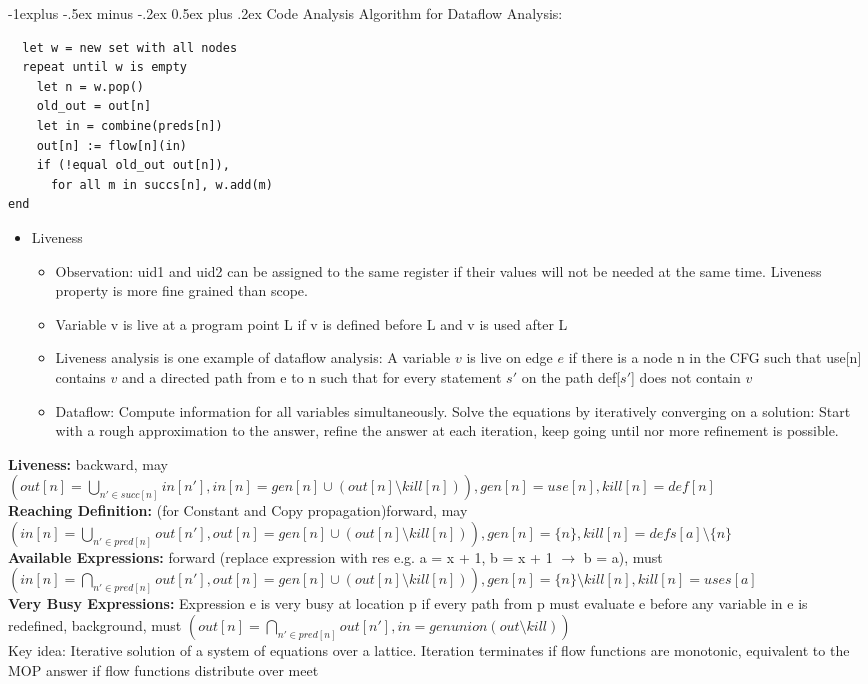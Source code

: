\documentclass[10pt,landscape]{article}
\makeatletter
\renewcommand{\subsection}{\@startsection{subsection}{2}{0mm}%
                                {-1explus -.5ex minus -.2ex}%
                                {0.5ex plus .2ex}%
                                {\normalfont\normalsize\bfseries}}
\makeatother
\begin{document}
\begin{multicols}{3}
\subsection{Code Analysis}
Algorithm for Dataflow Analysis:
\begin{verbatim}
  let w = new set with all nodes
  repeat until w is empty
    let n = w.pop()
    old_out = out[n]
    let in = combine(preds[n])
    out[n] := flow[n](in)
    if (!equal old_out out[n]),
      for all m in succs[n], w.add(m)
end
\end{verbatim}
\begin{itemize}
	\item Liveness
	\begin{itemize}
		\item Observation: uid1 and uid2 can be assigned to the same register if their values will not be needed at the same time. Liveness property is more fine grained than scope.
		\item Variable v is live at a program point L if v is defined before L and v is used after L
		\item Liveness analysis is one example of dataflow analysis: A variable $v$ is live on edge $e$ if there is a node n in the CFG such that use[n] contains $v$ and a directed path from e to n such that for every statement $s'$ on the path def[$s'$] does not contain $v$
		\item Dataflow: Compute information for all variables simultaneously. Solve the equations by iteratively converging on a solution: Start with a rough approximation to the answer, refine the answer at each iteration, keep going until nor more refinement is possible.
		\end{itemize}
		\end{itemize}
	  \textbf{Liveness:} backward, may $(out[n] = \bigcup_{n' \in succ[n]} in[n'], in[n] = gen[n] \cup (out[n] \setminus kill[n])), gen[n] = use[n], kill[n] = def[n]$\\
		\textbf{Reaching Definition:} (for Constant and Copy propagation)forward, may $(in[n] = \bigcup_{n' \in pred[n]} out[n'], out[n] = gen[n] \cup (out[n] \setminus kill[n])), gen[n] = \{n\}, kill[n] = defs[a]\setminus \{n\}$\\
		\textbf{Available Expressions:} forward (replace expression with res e.g. a = x + 1, b = x + 1 $\rightarrow$ b = a), must $(in[n] = \bigcap_{n' \in pred[n]} out[n'], out[n] = gen[n] \cup (out[n] \setminus kill[n])), gen[n] = \{n\} \setminus kill[n], kill[n] = uses[a]$\\
    \textbf{Very Busy Expressions:} Expression e is very busy at location p if every path from p
    must evaluate e before any variable in e is redefined, background, must $(out[n] = \bigcap_{n' \in pred[n]} out[n'], in = gen union (out \setminus kill))$\\
		Key idea: Iterative solution of a system of equations over a lattice. Iteration terminates if flow functions are monotonic, equivalent to the MOP answer if flow functions distribute over meet

\end{multicols}
\end{document}
